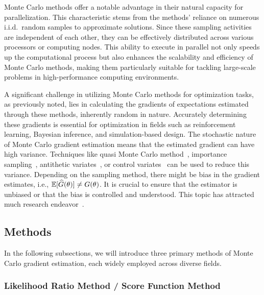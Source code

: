 \documentclass[12pt]{amsart}
\begin{document}
Monte Carlo methods offer a notable advantage in their natural capacity for parallelization. This characteristic stems from the methods' reliance on numerous i.i.d.~random samples to approximate solutions. Since these sampling activities are independent of each other, they can be effectively distributed across various processors or computing nodes. This ability to execute in parallel not only speeds up the computational process but also enhances the scalability and efficiency of Monte Carlo methods, making them particularly suitable for tackling large-scale problems in high-performance computing environments.







A significant challenge in utilizing Monte Carlo methods for optimization tasks, as previously noted, lies in calculating the gradients of expectations estimated through these methods, inherently random in nature. Accurately determining these gradients is essential for optimization in fields such as reinforcement learning, Bayesian inference, and simulation-based design. The stochastic nature of Monte Carlo gradient estimation means that the estimated gradient can have high variance. Techniques like quasi Monte Carlo method~\cite{caflisch1998monte}, importance sampling~\cite{tokdar2010importance}, antithetic variates~\cite{kroese2013handbook}, or control variates~\cite{rubinstein1985efficiency} can be used to reduce this variance. Depending on the sampling method, there might be bias in the gradient estimates, i.e., $\mathbb E[\widehat{G}(\theta)]\neq G(\theta)$. It is crucial to ensure that the estimator is unbiased or that the bias is controlled and understood. This topic has attracted much research endeavor~\cite{mark2001bias,chen2005stochastic,tucker2017rebar,nemeth2021stochastic}. 



\subsection{Methods}
In the following subsections, we will introduce three primary methods of Monte Carlo gradient estimation, each widely employed across diverse fields.


\subsubsection{Likelihood Ratio Method / Score Function Method}\label{subsubsec:score}
\end{document}
